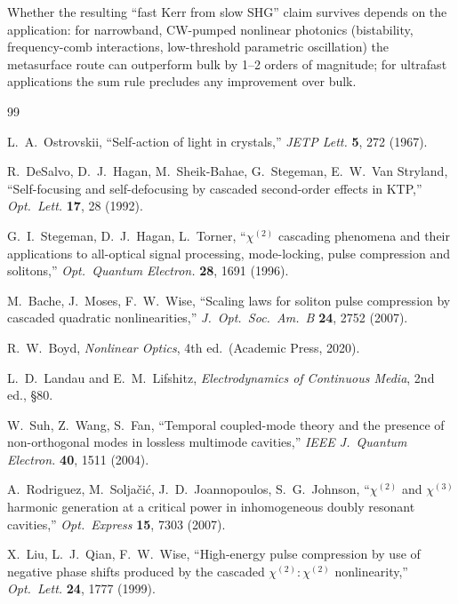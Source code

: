 \documentclass[11pt,a4paper]{article}
\begin{document}
Whether the resulting ``fast Kerr from slow SHG'' claim survives depends
on the application: for narrowband, CW-pumped nonlinear photonics
(bistability, frequency-comb interactions, low-threshold parametric
oscillation) the metasurface route can outperform bulk by 1--2 orders of
magnitude; for ultrafast applications the sum rule precludes any
improvement over bulk.

\begin{thebibliography}{99}

L.~A.~Ostrovskii,
``Self-action of light in crystals,''
\emph{JETP Lett.} \textbf{5}, 272 (1967).

R.~DeSalvo, D.~J.~Hagan, M.~Sheik-Bahae, G.~Stegeman, E.~W.~Van Stryland,
``Self-focusing and self-defocusing by cascaded second-order effects in KTP,''
\emph{Opt.\ Lett.} \textbf{17}, 28 (1992).

G.~I.~Stegeman, D.~J.~Hagan, L.~Torner,
``$\chi^{(2)}$ cascading phenomena and their applications to all-optical signal processing, mode-locking, pulse compression and solitons,''
\emph{Opt.\ Quantum Electron.} \textbf{28}, 1691 (1996).

M.~Bache, J.~Moses, F.~W.~Wise,
``Scaling laws for soliton pulse compression by cascaded quadratic nonlinearities,''
\emph{J.~Opt.\ Soc.\ Am.\ B} \textbf{24}, 2752 (2007).

R.~W.~Boyd, \emph{Nonlinear Optics}, 4th ed.\ (Academic Press, 2020).

L.~D.~Landau and E.~M.~Lifshitz,
\emph{Electrodynamics of Continuous Media}, 2nd ed., \S 80.

W.~Suh, Z.~Wang, S.~Fan,
``Temporal coupled-mode theory and the presence of non-orthogonal modes in lossless multimode cavities,''
\emph{IEEE J.~Quantum Electron.} \textbf{40}, 1511 (2004).

A.~Rodriguez, M.~Solja\v{c}i\'c, J.~D.~Joannopoulos, S.~G.~Johnson,
``$\chi^{(2)}$ and $\chi^{(3)}$ harmonic generation at a critical power in inhomogeneous doubly resonant cavities,''
\emph{Opt.\ Express} \textbf{15}, 7303 (2007).

X.~Liu, L.~J.~Qian, F.~W.~Wise,
``High-energy pulse compression by use of negative phase shifts produced by the cascaded $\chi^{(2)}{:}\chi^{(2)}$ nonlinearity,''
\emph{Opt.\ Lett.} \textbf{24}, 1777 (1999).


\end{thebibliography}
\end{document}
